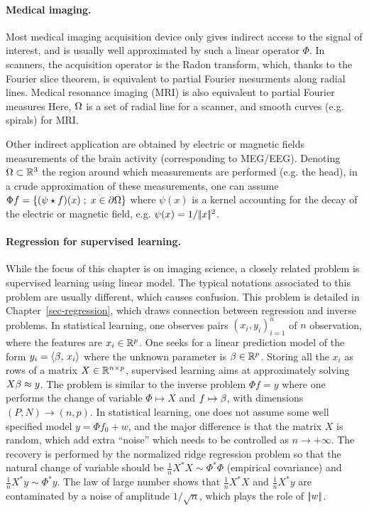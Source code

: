 \paragraph{Medical imaging.}

Most medical imaging acquisition device only gives indirect access to the signal of interest, and is usually well approximated by such a linear operator $\Phi$.
%
In scanners, the acquisition operator is the Radon transform, which, thanks to the Fourier slice theorem, is equivalent to partial Fourier mesurments along radial lines.
% 
Medical resonance imaging (MRI) is also equivalent to partial Fourier measures
Here, $\Omega$ is a set of radial line for a scanner, and smooth curves (e.g. spirals) for MRI. 

Other indirect application are obtained by electric or magnetic fields measurements of the brain activity (corresponding to MEG/EEG). Denoting $\Omega \subset \mathbb{R}^3$ the region around which measurements are performed (e.g. the head), in a crude approximation of these measurements, one can assume $\Phi f = \left\{ (\psi \star f)(x) \;;\; x \in \partial \Omega \right\}$ where $\psi(x)$ is a kernel accounting for the decay of the electric or magnetic field, e.g. $\psi(x)=1/|\!| x |\!|^2$. 



\paragraph{Regression for supervised learning.}

While the focus of this chapter is on imaging science, a closely related problem is supervised learning using linear model. The typical notations associated to this problem are usually different, which causes confusion. This problem is detailed in Chapter~\ref{sec-regression}, which draws connection between regression and inverse problems. 
%
In statistical learning, one observes pairs $(x_i,y_i)_{i=1}^n$ of $n$ observation, where the features are $x_i \in \mathbb{R}^p$. One seeks for a linear prediction model of the form $y_i = \langle \beta,\,x_i\rangle$ where the unknown parameter is $\beta \in \mathbb{R}^p$. Storing all the $x_i$ as rows of a matrix $X \in \mathbb{R}^{n \times p}$, supervised learning aims at approximately solving $X \beta \approx y$. The problem is similar to the inverse problem $\Phi f=y$ where one performs the change of variable $\Phi \mapsto X$ and $f \mapsto \beta$, with dimensions $(P,N) \rightarrow (n,p)$. 
%
In statistical learning, one does not assume some well specified model $y=\Phi f_0+w$, and the major difference is that the matrix $X$ is random, which add extra ``noise'' which needs to be controlled as $n \rightarrow +\infty$. The recovery is performed by the normalized ridge regression problem
so that the natural change of variable should be $\frac{1}{n}X^*X \sim \Phi^*\Phi$ (empirical covariance) and $\frac{1}{n}X^*y \sim \Phi^*y$.
%
The law of large number shows that $\frac{1}{n}X^*X$ and $\frac{1}{n}X^*y$ are contaminated by a noise of amplitude $1/\sqrt{n}$, which plays the role of $|\!| w |\!|$. 

